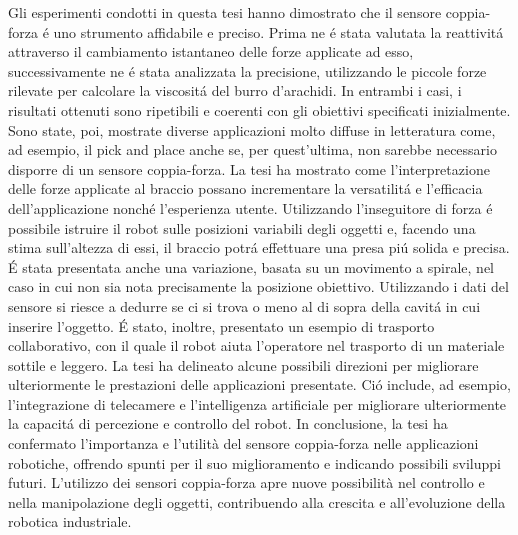 Gli esperimenti condotti in questa tesi hanno dimostrato che il sensore coppia-forza \'{e} uno strumento affidabile e preciso. 
Prima ne \'{e} stata valutata la reattivit\'{a} attraverso il cambiamento istantaneo delle forze applicate ad esso, 
successivamente ne \'{e} stata analizzata la precisione, utilizzando le piccole forze rilevate per calcolare la viscosit\'{a} del 
burro d'arachidi. 
In entrambi i casi, i risultati ottenuti sono ripetibili e coerenti con gli obiettivi specificati inizialmente. 
Sono state, poi, mostrate diverse applicazioni molto diffuse in letteratura come, ad esempio, il pick and place anche se, per 
quest'ultima, non sarebbe necessario disporre di un sensore coppia-forza. La tesi ha mostrato come l'interpretazione 
delle forze applicate al braccio possano incrementare la versatilit\'{a} e l'efficacia dell'applicazione nonch\'{e} l'esperienza 
utente. Utilizzando l'inseguitore di forza \'{e} possibile istruire il robot sulle posizioni variabili degli oggetti e, 
facendo una stima sull'altezza di essi, il braccio potr\'{a} effettuare una presa pi\'{u} solida e precisa. 
\'{E} stata presentata anche una variazione, basata su un movimento a spirale, nel caso in cui non sia nota precisamente la posizione 
obiettivo. Utilizzando i dati 
del sensore si riesce a dedurre se ci si trova o meno al di sopra della cavit\'{a} in cui inserire l'oggetto. 
\'{E} stato, inoltre, presentato un esempio di trasporto collaborativo, con il quale il robot aiuta l'operatore nel trasporto 
di un materiale sottile e leggero. 
La tesi ha delineato alcune possibili direzioni per migliorare ulteriormente le prestazioni delle applicazioni presentate. 
Ci\'{o} include, ad esempio, l'integrazione di telecamere e l'intelligenza artificiale per migliorare ulteriormente la capacit\'{a} 
di percezione e controllo del robot. 
In conclusione, la tesi ha confermato l'importanza e l'utilità del sensore coppia-forza nelle applicazioni robotiche, 
offrendo spunti per il suo miglioramento e indicando possibili sviluppi futuri. L'utilizzo dei sensori coppia-forza apre 
nuove possibilità nel controllo e nella manipolazione degli oggetti, contribuendo alla crescita e all'evoluzione 
della robotica industriale.